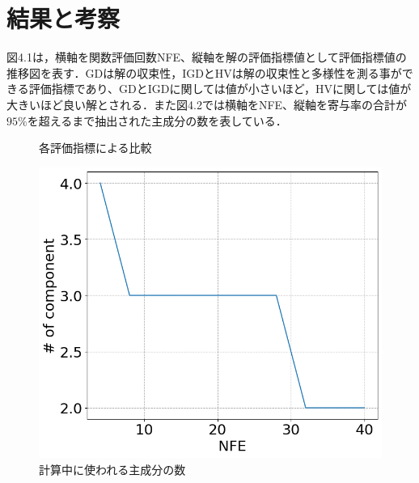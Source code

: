 \documentclass[11pt,a4j,notitlepage]{jsarticle}
\begin{document}
\section{結果と考察}
図4.1は，横軸を関数評価回数NFE、縦軸を解の評価指標値として評価指標値の推移図を表す．GDは解の収束性，IGDとHVは解の収束性と多様性を測る事ができる評価指標であり、GDとIGDに関しては値が小さいほど，HVに関しては値が大きいほど良い解とされる．また図4.2では横軸をNFE、縦軸を寄与率の合計が$95\%$を超えるまで抽出された主成分の数を表している．
\begin{figure}[htbp]
  \begin{center}
                \setlength{\abovecaptionskip}{0mm}
    \setlength{\belowcaptionskip}{0mm}
      \caption{各評価指標による比較}
  \label{fig:ranking}
  \end{center}
\end{figure}
\begin{figure}[htbp]
\begin{center}
  \includegraphics[width=0.3\linewidth]{img/4val-4pop-10gen-component-hist.png}
             \setlength{\abovecaptionskip}{0mm}
  \setlength{\belowcaptionskip}{0mm}
    \caption{計算中に使われる主成分の数}
\label{fig:nsgaiii}
\end{center}
\end{figure}
\end{document}
